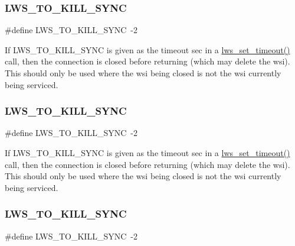 \subsubsection{\texorpdfstring{L\+W\+S\+\_\+\+T\+O\+\_\+\+K\+I\+L\+L\+\_\+\+S\+Y\+NC}{LWS\_TO\_KILL\_SYNC}\hspace{0.1cm}{\footnotesize\ttfamily [2/6]}}
{\footnotesize\ttfamily \#define L\+W\+S\+\_\+\+T\+O\+\_\+\+K\+I\+L\+L\+\_\+\+S\+Y\+NC~-\/2}

If L\+W\+S\+\_\+\+T\+O\+\_\+\+K\+I\+L\+L\+\_\+\+S\+Y\+NC is given as the timeout sec in a \hyperlink{group__timeout_gaced9f9237f6172fed9f730a2af51345a}{lws\+\_\+set\+\_\+timeout()} call, then the connection is closed before returning (which may delete the wsi). This should only be used where the wsi being closed is not the wsi currently being serviced. \mbox{\label{group__timeout_ga3cef438d5bbd20a33afbec8e29a0b9a6}} 
\subsubsection{\texorpdfstring{L\+W\+S\+\_\+\+T\+O\+\_\+\+K\+I\+L\+L\+\_\+\+S\+Y\+NC}{LWS\_TO\_KILL\_SYNC}\hspace{0.1cm}{\footnotesize\ttfamily [3/6]}}
{\footnotesize\ttfamily \#define L\+W\+S\+\_\+\+T\+O\+\_\+\+K\+I\+L\+L\+\_\+\+S\+Y\+NC~-\/2}

If L\+W\+S\+\_\+\+T\+O\+\_\+\+K\+I\+L\+L\+\_\+\+S\+Y\+NC is given as the timeout sec in a \hyperlink{group__timeout_gaced9f9237f6172fed9f730a2af51345a}{lws\+\_\+set\+\_\+timeout()} call, then the connection is closed before returning (which may delete the wsi). This should only be used where the wsi being closed is not the wsi currently being serviced. \mbox{\label{group__timeout_ga3cef438d5bbd20a33afbec8e29a0b9a6}} 
\subsubsection{\texorpdfstring{L\+W\+S\+\_\+\+T\+O\+\_\+\+K\+I\+L\+L\+\_\+\+S\+Y\+NC}{LWS\_TO\_KILL\_SYNC}\hspace{0.1cm}{\footnotesize\ttfamily [4/6]}}
{\footnotesize\ttfamily \#define L\+W\+S\+\_\+\+T\+O\+\_\+\+K\+I\+L\+L\+\_\+\+S\+Y\+NC~-\/2}

